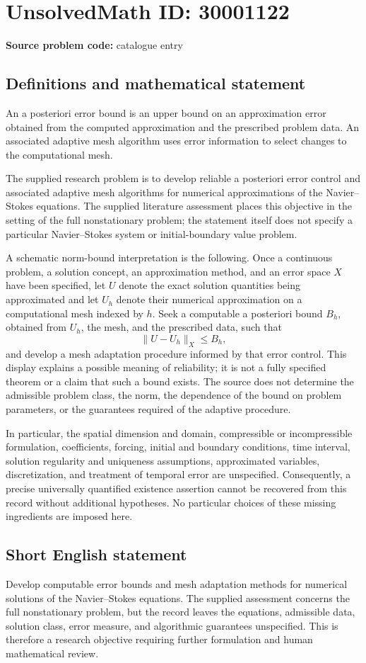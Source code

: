 \documentclass[11pt]{article}
\begin{document}
\section*{UnsolvedMath ID: 30001122}
\textbf{Source problem code:} catalogue entry
\subsection{Definitions and mathematical statement}
An a posteriori error bound is an upper bound on an approximation error obtained from the computed approximation and the prescribed problem data. An associated adaptive mesh algorithm uses error information to select changes to the computational mesh.

The supplied research problem is to develop reliable a posteriori error control and associated adaptive mesh algorithms for numerical approximations of the Navier--Stokes equations. The supplied literature assessment places this objective in the setting of the full nonstationary problem; the statement itself does not specify a particular Navier--Stokes system or initial-boundary value problem.

A schematic norm-bound interpretation is the following. Once a continuous problem, a solution concept, an approximation method, and an error space \(X\) have been specified, let \(U\) denote the exact solution quantities being approximated and let \(U_h\) denote their numerical approximation on a computational mesh indexed by \(h\). Seek a computable a posteriori bound \(B_h\), obtained from \(U_h\), the mesh, and the prescribed data, such that
\[
\lVert U-U_h\rVert_X \leq B_h,
\]
and develop a mesh adaptation procedure informed by that error control. This display explains a possible meaning of reliability; it is not a fully specified theorem or a claim that such a bound exists. The source does not determine the admissible problem class, the norm, the dependence of the bound on problem parameters, or the guarantees required of the adaptive procedure.

In particular, the spatial dimension and domain, compressible or incompressible formulation, coefficients, forcing, initial and boundary conditions, time interval, solution regularity and uniqueness assumptions, approximated variables, discretization, and treatment of temporal error are unspecified. Consequently, a precise universally quantified existence assertion cannot be recovered from this record without additional hypotheses. No particular choices of these missing ingredients are imposed here.
\subsection{Short English statement}
Develop computable error bounds and mesh adaptation methods for numerical solutions of the Navier--Stokes equations. The supplied assessment concerns the full nonstationary problem, but the record leaves the equations, admissible data, solution class, error measure, and algorithmic guarantees unspecified. This is therefore a research objective requiring further formulation and human mathematical review.
\end{document}
